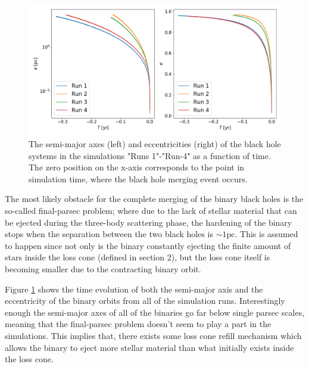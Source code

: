 \documentclass[english, oneside]{HYgradu}
\begin{document}
\begin{figure}[h]
	\centering
	\includegraphics[width=\textwidth]{semi_major_and_ecc.png}
	\caption{The semi-major axes (left) and eccentricities (right) of the black hole systems in the simulations "Runs 1"-"Run-4" as a function of time. The zero position on the x-axis corresponds to the point in simulation time, where the black hole merging event occurs.}
	\label{figure:semi_and_ecc}
\end{figure}


The most likely obstacle for the complete merging of the binary black holes is the so-called final-parsec problem; where due to the lack of stellar material that can be ejected during the three-body scattering phase, the hardening of the binary stops when the separation between the two black holes is $\sim 1 \mathrm{pc}$. This is assumed to happen since not only is the binary constantly ejecting the finite amount of stars inside the loss cone (defined in section 2), but the loss cone itself is becoming smaller due to the contracting binary orbit.

Figure \ref{figure:semi_and_ecc} shows the time evolution of both the semi-major axis and the eccentricity of the binary orbits from all of the simulation runs. Interestingly enough the semi-major axes of all of the binaries go far below single parsec scales, meaning that the final-parsec problem doesn't seem to play a part in the simulations. This implies that, there exists some loss cone refill mechanism which allows the binary to eject more stellar material than what initially exists inside the loss cone.
\end{document}
